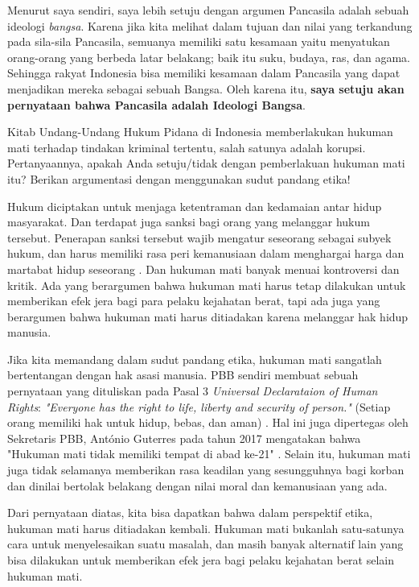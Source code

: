\documentclass[
  12pt,
  answers  
]{exam}
\begin{document}
\begin{questions}
\begin{solution}
        Menurut saya sendiri, saya lebih setuju dengan argumen Pancasila adalah sebuah ideologi \emph{bangsa}. Karena jika kita melihat dalam tujuan dan nilai yang terkandung pada sila-sila Pancasila, semuanya memiliki satu kesamaan yaitu menyatukan orang-orang yang berbeda latar belakang; baik itu suku, budaya, ras, dan agama. Sehingga rakyat Indonesia bisa memiliki kesamaan dalam Pancasila yang dapat menjadikan mereka sebagai sebuah Bangsa. Oleh karena itu, \textbf{saya setuju akan pernyataan bahwa Pancasila adalah Ideologi Bangsa}.
      \end{solution}

      \question
      Kitab Undang-Undang Hukum Pidana di Indonesia memberlakukan hukuman mati terhadap tindakan kriminal tertentu, salah satunya adalah korupsi. Pertanyaannya, apakah Anda setuju/tidak dengan pemberlakuan hukuman mati itu? Berikan argumentasi dengan menggunakan sudut pandang etika!
      \begin{solution}
        Hukum diciptakan untuk menjaga ketentraman dan kedamaian antar hidup masyarakat. Dan terdapat juga sanksi bagi orang yang melanggar hukum tersebut. Penerapan sanksi tersebut wajib mengatur seseorang sebagai subyek hukum, dan harus memiliki rasa peri kemanusiaan dalam menghargai harga dan martabat hidup seseorang \cite{siburianHUKUMANMATIDI2021}. Dan hukuman mati banyak menuai kontroversi dan kritik. Ada yang berargumen bahwa hukuman mati harus tetap dilakukan untuk memberikan efek jera bagi para pelaku kejahatan berat, tapi ada juga yang berargumen bahwa hukuman mati harus ditiadakan karena melanggar hak hidup manusia. 

        Jika kita memandang dalam sudut pandang etika, hukuman mati sangatlah bertentangan dengan hak asasi manusia. PBB sendiri membuat sebuah pernyataan yang dituliskan pada Pasal 3 \emph{Universal Declarataion of Human Rights}: \emph{"Everyone has the right to life, liberty and security of person."} (Setiap orang memiliki hak untuk hidup, bebas, dan aman) \cite{nationsUniversalDeclarationHuman}. Hal ini juga dipertegas oleh Sekretaris PBB, António Guterres pada tahun 2017 mengatakan bahwa "Hukuman mati tidak memiliki tempat di abad ke-21" \cite{DeathPenaltyHas2017}. Selain itu, hukuman mati juga tidak selamanya memberikan rasa keadilan yang sesungguhnya bagi korban dan dinilai bertolak belakang dengan nilai moral dan kemanusiaan yang ada. 

        Dari pernyataan diatas, kita bisa dapatkan bahwa dalam perspektif etika, hukuman mati harus ditiadakan kembali. Hukuman mati bukanlah satu-satunya cara untuk menyelesaikan suatu masalah, dan masih banyak alternatif lain yang bisa dilakukan untuk memberikan efek jera bagi pelaku kejahatan berat selain hukuman mati. 
      \end{solution}


\end{questions}
\end{document}
